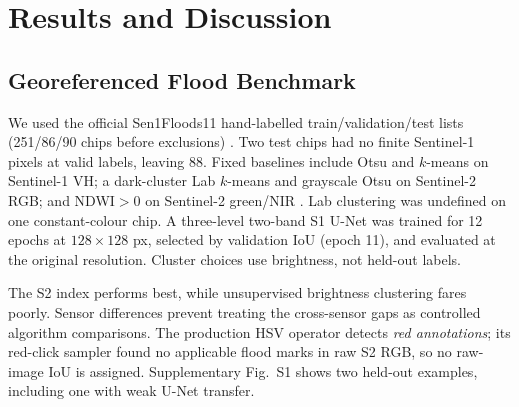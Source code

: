 \section{Results and Discussion}
\label{sec:results}

\subsection{Georeferenced Flood Benchmark}
\label{sec:gtres}
We used the official Sen1Floods11 hand-labelled train/validation/test lists (251/86/90 chips before exclusions) \cite{bonafilia2020sen1floods11}. Two test chips had no finite Sentinel-1 pixels at valid labels, leaving 88. Fixed baselines include Otsu and $k$-means on Sentinel-1 VH; a dark-cluster Lab $k$-means and grayscale Otsu on Sentinel-2 RGB; and NDWI$>0$ on Sentinel-2 green/NIR \cite{mcfeeters1996ndwi}. Lab clustering was undefined on one constant-colour chip. A three-level two-band S1 U-Net was trained for 12 epochs at $128\times128$ px, selected by validation IoU (epoch 11), and evaluated at the original resolution. Cluster choices use brightness, not held-out labels.

\begin{table}[t]
\centering
\caption{Held-out Sen1Floods11 hand-labelled chips. Metrics pool labelled pixels; mean-chip IoU exposes site variation. Lab $k$-means has 87 valid chips, all others 88.}
\label{tab:gt}
\footnotesize
{}
\end{table}
The S2 index performs best, while unsupervised brightness clustering fares poorly. Sensor differences prevent treating the cross-sensor gaps as controlled algorithm comparisons. The production HSV operator detects \emph{red annotations}; its red-click sampler found no applicable flood marks in raw S2 RGB, so no raw-image IoU is assigned. Supplementary Fig.~S1 shows two held-out examples, including one with weak U-Net transfer.

